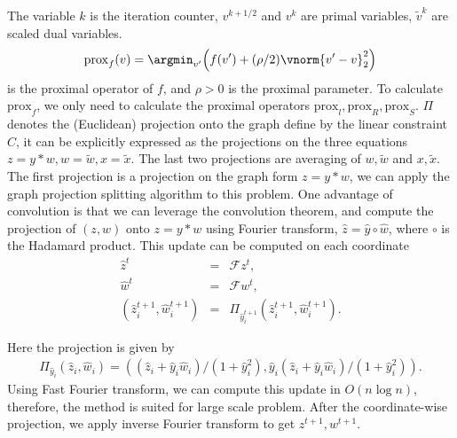 \documentclass[12pt]{article}
\begin{document}
The variable $k$ is the iteration counter, $v^{k+1/2}$ and $v^{k}$  are primal
variables, $\tilde{v}^k$ are scaled dual variables.
\[
  \mathrm{prox}_{f}(v) = \argmin_{v'}\Big(f(v') + (\rho/2) \vnorm{v' - v}_2^2\Big)
\]
is the proximal operator of $f$,
and $\rho>0$ is the proximal parameter. To calculate $\mathrm{prox}_{f}$, we only need to calculate the proximal operators $\mathrm{prox}_{l},\mathrm{prox}_{R},\mathrm{prox}_{S}$.
$\Pi$ denotes the (Euclidean)
projection onto the graph define by the linear constraint $C$, it can be explicitly expressed as the projections on the three equations $z = y*w, w = \tilde{w}, x = \tilde{x}$. The last two projections are averaging of $w, \tilde{w}$ and $x, \tilde{x}$. 
The first projection is a projection on the graph form  $z = y*w$, we can apply the graph projection splitting algorithm \cite{fougner2015parameter} to this problem. One advantage of convolution is that we can leverage the convolution theorem, and compute the projection of $(z,w)$ onto $z = y*w$ using Fourier transform, $\hat z =\hat y  \circ \hat w$, where $ \circ$ is the Hadamard product.  
This update can be computed on each coordinate
\begin{eqnarray*}
    \hat z^{t} &=& \mathcal{F}  z^{t},\\
    \hat w^{t} &=& \mathcal{F}  w^{t}, \\
 (\hat z^{t+1}_i, \hat w^{t+1}_i) &=& \Pi_{\hat y^{t+1}_i}(\hat z^{t+1}_i, \hat w^{t+1}_i).
\end{eqnarray*} 
  
 Here the projection  is given by
\begin{eqnarray*}
 \Pi_{\hat y_i}(\hat z_i, \hat w_i)= ((\hat z_i+ \hat y_i \hat w_i)/(1+\hat y_i^2), \hat y_i(\hat z_i+ \hat y_i \hat w_i)/(1+\hat y_i^2)).
  \end{eqnarray*} 
 Using Fast Fourier transform, we can compute this update in $O(n\log n)$, therefore, the method is suited for large scale problem. 
 After the coordinate-wise projection, we apply inverse Fourier transform to get 
 $z^{t+1}, w^{t+1}$.
\end{document}
